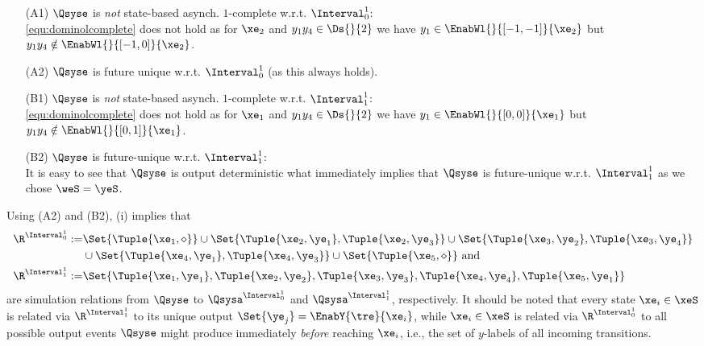 \begin{enumerate}
 \item[(A1)] $\Qsyse$ is \emph{not} state-based asynch. $1$-complete w.r.t. $\Interval^1_0$:\\
 \eqref{equ:dominolcomplete} does not hold as for $\xe_2$ and $y_1y_4\in\Ds{}{2}$ we have $y_1\in\EnabWl{}{[-1,-1]}{\xe_2}$ but $y_1y_4\notin\EnabWl{}{[-1,0]}{\xe_2}$.
 \item[(A2)] $\Qsyse$ is future unique w.r.t. $\Interval^1_0$ (as this always holds).
\item[(B1)] $\Qsyse$ is \emph{not} state-based asynch. $1$-complete w.r.t. $\Interval^1_1$:\\
\eqref{equ:dominolcomplete} does not hold as for $\xe_1$ and $y_1y_4\in\Ds{}{2}$ we have $y_1\in\EnabWl{}{[0,0]}{\xe_1}$ but $y_1y_4\notin\EnabWl{}{[0,1]}{\xe_1}$.
 \item[(B2)] $\Qsyse$ is future-unique w.r.t. $\Interval^1_1$:\\
 It is easy to see that $\Qsyse$ is output deterministic what immediately implies that $\Qsyse$ is future-unique w.r.t. $\Interval^1_1$ as we chose $\weS=\yeS$.
\end{enumerate}

\noindent Using (A2) and (B2),  (i) implies that
\begin{subequations}\label{equ:example:Rl1}
 \begin{align}
 \R^{\Interval^1_0}:=&\Set{\Tuple{\xe_1,\diamond}}
 \cup\Set{\Tuple{\xe_2,\ye_1},\Tuple{\xe_2,\ye_3}}
 \cup\Set{\Tuple{\xe_3,\ye_2},\Tuple{\xe_3,\ye_4}}\notag\\
 &\cup\Set{\Tuple{\xe_4,\ye_1},\Tuple{\xe_4,\ye_3}}\cup\Set{\Tuple{\xe_5,\diamond}}~\text{and}\\
   \R^{\Interval^1_1}:=&\Set{\Tuple{\xe_1,\ye_1},\Tuple{\xe_2,\ye_2},\Tuple{\xe_3,\ye_3},\Tuple{\xe_4,\ye_4},\Tuple{\xe_5,\ye_1}}
\end{align}
\end{subequations}
are simulation relations from $\Qsyse$ to $\Qsysa^{\Interval^1_0}$ and $\Qsysa^{\Interval^1_1}$, respectively. It should be noted that every state $\xe_i\in\xeS$ is related via $\R^{\Interval^1_1}$ to its unique output $\Set{\ye_j}=\EnabY{\tre}{\xe_i}$, while $\xe_i\in\xeS$ is related via $\R^{\Interval^1_0}$ to all possible output events $\Qsyse$ might produce immediately \emph{before} reaching $\xe_i$, i.e., the set of $y$-labels of all incoming transitions. 

